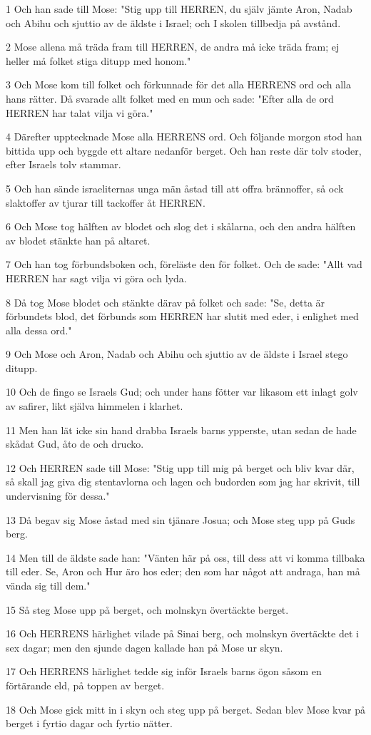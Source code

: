 \par 1 Och han sade till Mose: "Stig upp till HERREN, du själv jämte Aron, Nadab och Abihu och sjuttio av de äldste i Israel; och I skolen tillbedja på avstånd.
\par 2 Mose allena må träda fram till HERREN, de andra må icke träda fram; ej heller må folket stiga ditupp med honom."
\par 3 Och Mose kom till folket och förkunnade för det alla HERRENS ord och alla hans rätter. Då svarade allt folket med en mun och sade: "Efter alla de ord HERREN har talat vilja vi göra."
\par 4 Därefter upptecknade Mose alla HERRENS ord. Och följande morgon stod han bittida upp och byggde ett altare nedanför berget. Och han reste där tolv stoder, efter Israels tolv stammar.
\par 5 Och han sände israeliternas unga män åstad till att offra brännoffer, så ock slaktoffer av tjurar till tackoffer åt HERREN.
\par 6 Och Mose tog hälften av blodet och slog det i skålarna, och den andra hälften av blodet stänkte han på altaret.
\par 7 Och han tog förbundsboken och, föreläste den för folket. Och de sade: "Allt vad HERREN har sagt vilja vi göra och lyda.
\par 8 Då tog Mose blodet och stänkte därav på folket och sade: "Se, detta är förbundets blod, det förbunds som HERREN har slutit med eder, i enlighet med alla dessa ord."
\par 9 Och Mose och Aron, Nadab och Abihu och sjuttio av de äldste i Israel stego ditupp.
\par 10 Och de fingo se Israels Gud; och under hans fötter var likasom ett inlagt golv av safirer, likt själva himmelen i klarhet.
\par 11 Men han lät icke sin hand drabba Israels barns ypperste, utan sedan de hade skådat Gud, åto de och drucko.
\par 12 Och HERREN sade till Mose: "Stig upp till mig på berget och bliv kvar där, så skall jag giva dig stentavlorna och lagen och budorden som jag har skrivit, till undervisning för dessa."
\par 13 Då begav sig Mose åstad med sin tjänare Josua; och Mose steg upp på Guds berg.
\par 14 Men till de äldste sade han: "Vänten här på oss, till dess att vi komma tillbaka till eder. Se, Aron och Hur äro hos eder; den som har något att andraga, han må vända sig till dem."
\par 15 Så steg Mose upp på berget, och molnskyn övertäckte berget.
\par 16 Och HERRENS härlighet vilade på Sinai berg, och molnskyn övertäckte det i sex dagar; men den sjunde dagen kallade han på Mose ur skyn.
\par 17 Och HERRENS härlighet tedde sig inför Israels barns ögon såsom en förtärande eld, på toppen av berget.
\par 18 Och Mose gick mitt in i skyn och steg upp på berget. Sedan blev Mose kvar på berget i fyrtio dagar och fyrtio nätter.

